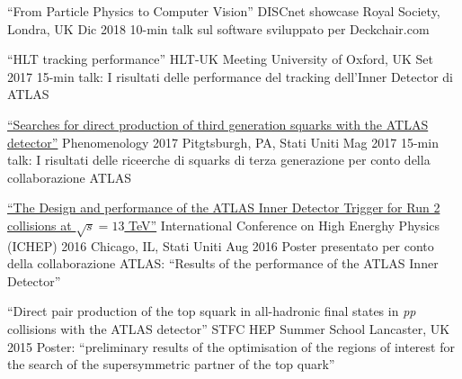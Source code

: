 \begin{cventries}
  \cventry
    {``From Particle Physics to Computer Vision''}
    {DISCnet showcase}
    {Royal Society, Londra, UK}
    {Dic 2018}
    {10-min talk sul software sviluppato per Deckchair.com}

  \cventry
    {``HLT tracking performance''}
    {HLT-UK Meeting}
    {University of Oxford, UK}
    {Set 2017}
    {15-min talk: I risultati delle performance del tracking dell'Inner Detector di ATLAS }

  \cventry
    {
    \href{http://cds.cern.ch/record/2263055/files/ATL-PHYS-SLIDE-2017-220.pdf}{``Searches for direct production of third generation squarks with the ATLAS detector''}
    }
    {Phenomenology 2017}
    {Pitgtsburgh, PA, Stati Uniti}
    {Mag 2017}
    {15-min talk: I risultati delle riceerche di squarks di terza generazione per conto della collaborazione ATLAS}

  \cventry
    {
    \href{https://indico.cern.ch/event/432527/contributions/1071672/attachments/1317672/1974610/FMiano-IDTrigger-ICHEP.pdf}
    {``The Design and performance of the ATLAS Inner Detector Trigger for Run 2 collisions at $\sqrt{s} = 13$ TeV''}
    }
    {International Conference on High Energhy Physics (ICHEP) 2016}
    {Chicago, IL, Stati Uniti}
    {Aug 2016}
    {Poster presentato per conto della collaborazione ATLAS: ``Results of the performance of the ATLAS Inner Detector''}

  \cventry
    {``Direct pair production of the top squark in all-hadronic final states in \emph{pp} collisions with the ATLAS detector''}
    {STFC HEP Summer School}
    {Lancaster, UK}
    {2015}
    {Poster: ``preliminary results of the optimisation of the regions of interest for the search of the supersymmetric partner of the top quark''}

\end{cventries}
